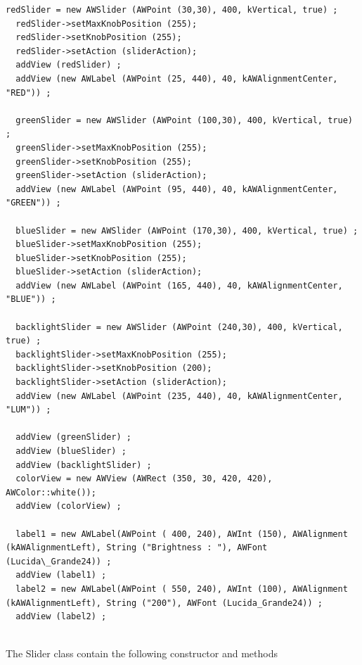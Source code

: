 \documentclass[a4paper,11pt]{extarticle}
\begin{document}
\begin{lstlisting}[language=Arduinonl]
 redSlider = new AWSlider (AWPoint (30,30), 400, kVertical, true) ;
  redSlider->setMaxKnobPosition (255);
  redSlider->setKnobPosition (255);
  redSlider->setAction (sliderAction);
  addView (redSlider) ;
  addView (new AWLabel (AWPoint (25, 440), 40, kAWAlignmentCenter, "RED")) ;
  
  greenSlider = new AWSlider (AWPoint (100,30), 400, kVertical, true) ;
  greenSlider->setMaxKnobPosition (255);
  greenSlider->setKnobPosition (255);
  greenSlider->setAction (sliderAction);
  addView (new AWLabel (AWPoint (95, 440), 40, kAWAlignmentCenter, "GREEN")) ;

  blueSlider = new AWSlider (AWPoint (170,30), 400, kVertical, true) ;
  blueSlider->setMaxKnobPosition (255);
  blueSlider->setKnobPosition (255);
  blueSlider->setAction (sliderAction);
  addView (new AWLabel (AWPoint (165, 440), 40, kAWAlignmentCenter, "BLUE")) ;

  backlightSlider = new AWSlider (AWPoint (240,30), 400, kVertical, true) ;
  backlightSlider->setMaxKnobPosition (255);
  backlightSlider->setKnobPosition (200);
  backlightSlider->setAction (sliderAction);
  addView (new AWLabel (AWPoint (235, 440), 40, kAWAlignmentCenter, "LUM")) ;

  addView (greenSlider) ;
  addView (blueSlider) ;
  addView (backlightSlider) ;
  colorView = new AWView (AWRect (350, 30, 420, 420), AWColor::white());
  addView (colorView) ;

  label1 = new AWLabel(AWPoint ( 400, 240), AWInt (150), AWAlignment (kAWAlignmentLeft), String ("Brightness : "), AWFont (Lucida\_Grande24)) ;
  addView (label1) ;
  label2 = new AWLabel(AWPoint ( 550, 240), AWInt (100), AWAlignment (kAWAlignmentLeft), String ("200"), AWFont (Lucida_Grande24)) ;
  addView (label2) ;
\end{lstlisting}

~\\ The Slider class contain the following constructor and methods
\end{document}
